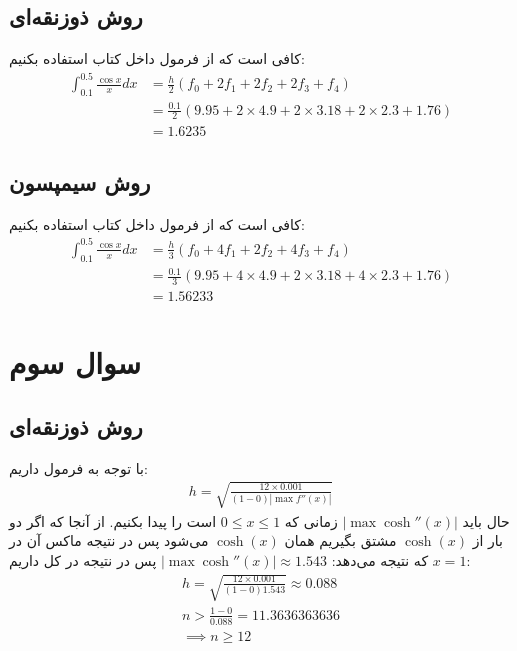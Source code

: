 \documentclass[]{article}
\begin{document}
\subsection*{روش ذوزنقه‌ای}
کافی است که از فرمول داخل کتاب استفاده بکنیم:
\begin{align*}
    \int_{0.1}^{0.5} \frac{\cos x}{x} dx &= \frac{h}{2} (f_0 + 2f_1 + 2f_2 + 2f_3 + f_4)\\
    &= \frac{0.1}{2} (9.95 + 2 \times 4.9 + 2 \times 3.18 + 2 \times 2.3 + 1.76)\\
    &= \boxed{1.6235}
\end{align*}
\subsection*{روش سیمپسون}
کافی است که از فرمول داخل کتاب استفاده بکنیم:
\begin{align*}
    \int_{0.1}^{0.5} \frac{\cos x}{x} dx &= \frac{h}{3} (f_0 + 4f_1 + 2f_2 + 4f_3 + f_4)\\
    &= \frac{0.1}{3} (9.95 + 4 \times 4.9 + 2 \times 3.18 + 4 \times 2.3 + 1.76)\\
    &= \boxed{1.56233}
\end{align*}
\section*{سوال سوم}
\subsection*{روش ذوزنقه‌ای}
با توجه به فرمول داریم:
\begin{gather*}
    h = \sqrt{\frac{12 \times 0.001}{(1 - 0) |\max f''(x)|}}
\end{gather*}
حال باید
$|\max \operatorname{cosh}''(x)|$
زمانی که
$0 \le x \le 1$
است را پیدا بکنیم. از آنجا که اگر دو بار از
$\operatorname{cosh}(x)$
مشتق بگیریم همان
$\operatorname{cosh}(x)$
می‌شود پس در نتیجه ماکس آن در
$x = 1$
که نتیجه می‌دهد:
$|\max \operatorname{cosh}''(x)| \approx 1.543$
پس در نتیجه در کل داریم:
\begin{gather*}
    h = \sqrt{\frac{12 \times 0.001}{(1 - 0) 1.543}} \approx 0.088\\
    n > \frac{1 - 0}{0.088} = 11.3636363636\\
    \implies \boxed{n \ge 12}
\end{gather*}
\end{document}
